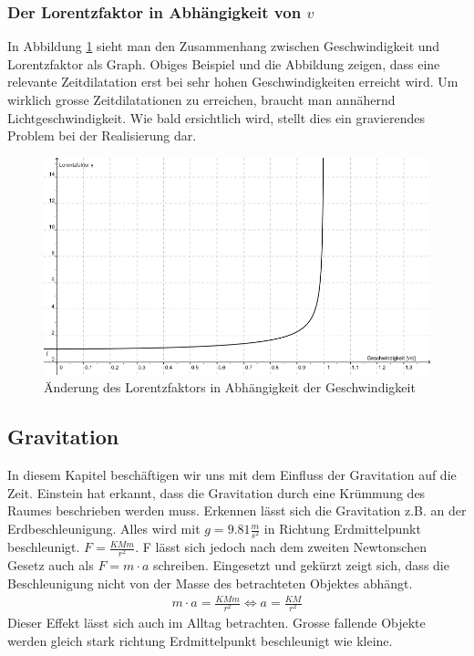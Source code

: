 \begin{refsection}
\subsubsection{Der Lorentzfaktor in Abhängigkeit von $v$}

In Abbildung \ref{skript:zeitreisen:fig:lorentz} sieht man den Zusammenhang zwischen Geschwindigkeit und Lorentzfaktor als Graph. Obiges Beispiel und die Abbildung zeigen, dass eine relevante Zeitdilatation erst bei sehr hohen Geschwindigkeiten erreicht wird. Um wirklich grosse Zeitdilatationen zu erreichen, braucht man annähernd Lichtgeschwindigkeit. Wie bald ersichtlich wird, stellt dies ein gravierendes Problem bei der Realisierung dar.
\begin{figure}[H]
    \centering
    \includegraphics[width=\hsize]{zeitreisen/Lorentzfaktor.jpg}
    \caption{Änderung des Lorentzfaktors in Abh\"angigkeit der Geschwindigkeit}
        \label{skript:zeitreisen:fig:lorentz} 
\end{figure}
\subsection{Gravitation} \label{Gravitation}

	In diesem Kapitel beschäftigen wir uns mit dem Einfluss der Gravitation auf die Zeit. Einstein hat erkannt, dass die Gravitation durch eine Krümmung des Raumes beschrieben werden muss. Erkennen lässt sich die Gravitation z.B. an der Erdbeschleunigung. Alles wird mit $g=9.81\frac{m}{s^2}$ in Richtung Erdmittelpunkt beschleunigt. $F=\frac{KMm}{r^2}$. F lässt sich jedoch nach dem zweiten Newtonschen Gesetz auch als $F=m\cdot a$ schreiben. Eingesetzt und gekürzt zeigt sich, dass die Beschleunigung nicht von der Masse des betrachteten Objektes abhängt.
	\begin{align*}
		m\cdot a = \frac{KMm}{r^2} \Leftrightarrow a=\frac{KM}{r^2} 
	\end{align*}
	Dieser Effekt lässt sich auch im Alltag betrachten. Grosse fallende Objekte werden gleich stark richtung Erdmittelpunkt beschleunigt wie kleine.
	

\end{refsection}
